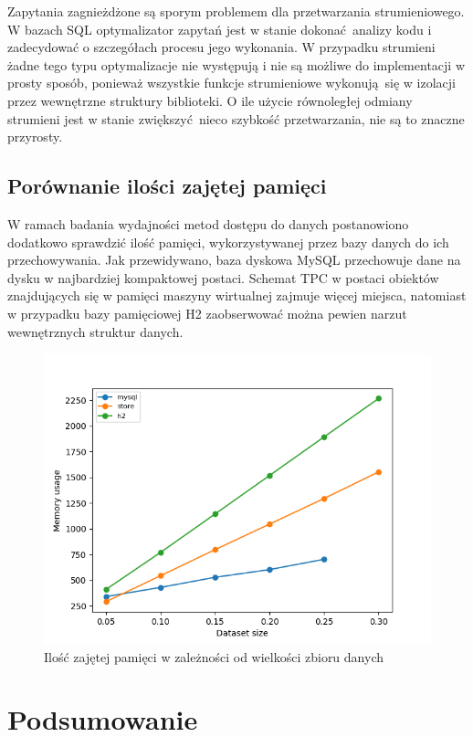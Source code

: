 \documentclass[12pt,twoside,openright]{extarticle}
\begin{document}
    Zapytania zagnieżdżone są sporym problemem dla przetwarzania strumieniowego. W bazach SQL optymalizator zapytań jest w stanie dokonać analizy kodu i zadecydować o szczegółach procesu jego wykonania. W przypadku strumieni żadne tego typu optymalizacje nie występują i nie są możliwe do implementacji w prosty sposób, ponieważ wszystkie funkcje strumieniowe wykonują się w izolacji przez wewnętrzne struktury biblioteki. O ile użycie równoległej odmiany strumieni jest w stanie zwiększyć nieco szybkość przetwarzania, nie są to znaczne przyrosty.


\subsection{Porównanie ilości zajętej pamięci}

    W ramach badania wydajności metod dostępu do danych postanowiono dodatkowo sprawdzić ilość pamięci, wykorzystywanej przez bazy danych do ich przechowywania. Jak przewidywano, baza dyskowa MySQL przechowuje dane na dysku w najbardziej kompaktowej postaci. Schemat TPC w postaci obiektów znajdujących się w pamięci maszyny wirtualnej zajmuje więcej miejsca, natomiast w przypadku bazy pamięciowej H2 zaobserwować można pewien narzut wewnętrznych struktur danych.

\begin{figure}[H]
\centering
\includegraphics[width=13cm]{plots/memory}
\caption{Ilość zajętej pamięci w zależności od wielkości zbioru danych}
    \label{fig:memoryconsumption}
\end{figure}
    

\cleardoublepage
\section{Podsumowanie}
\end{document}
